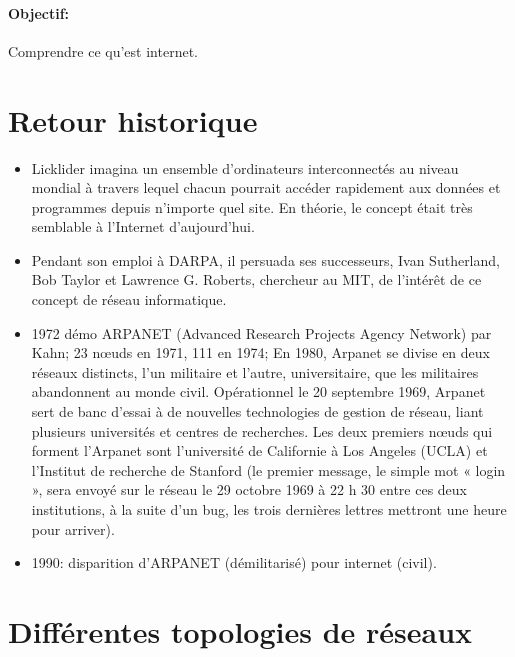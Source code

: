 \documentclass[a4paper,11pt]{article}
\begin{document}
\begin{Form}
\paragraph{Objectif:} Comprendre ce qu'est internet.
\section*{Retour historique}
\begin{commentprof}
\begin{itemize}
\item Licklider imagina un ensemble d’ordinateurs interconnectés au niveau mondial à travers lequel chacun pourrait accéder rapidement aux données et programmes depuis n’importe quel site. En théorie, le concept était très semblable à l’Internet d’aujourd’hui. 
\item Pendant son emploi à DARPA, il persuada ses successeurs, Ivan Sutherland, Bob Taylor et Lawrence G. Roberts, chercheur au MIT, de l’intérêt de ce concept de réseau informatique.
\item 1972 démo ARPANET (Advanced Research Projects Agency Network) par Kahn; 23 nœuds en 1971, 111 en 1974; En 1980, Arpanet se divise en deux réseaux distincts, l'un militaire et l'autre, universitaire, que les militaires abandonnent au monde civil. Opérationnel le 20 septembre 1969, Arpanet sert de banc d'essai à de nouvelles technologies de gestion de réseau, liant plusieurs universités et centres de recherches. Les deux premiers nœuds qui forment l'Arpanet sont l'université de Californie à Los Angeles (UCLA) et l'Institut de recherche de Stanford (le premier message, le simple mot « login », sera envoyé sur le réseau le 29 octobre 1969 à 22 h 30 entre ces deux institutions, à la suite d'un bug, les trois dernières lettres mettront une heure pour arriver).
\item 1990: disparition d'ARPANET (démilitarisé) pour internet (civil).
\end{itemize}
\end{commentprof}
\section{Différentes topologies de réseaux}

\end{Form}
\end{document}
